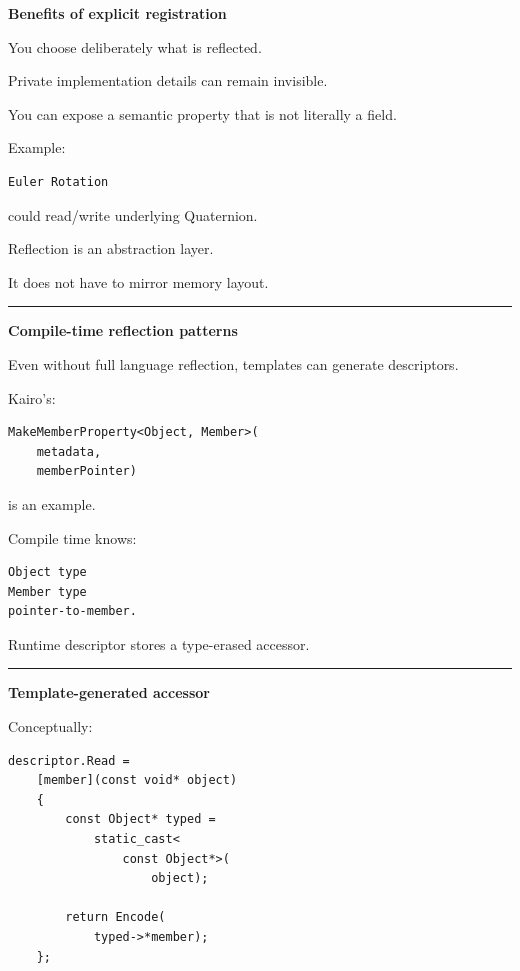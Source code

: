 \textbf{Benefits of explicit registration}

You choose deliberately what is reflected.

Private implementation details can remain invisible.

You can expose a semantic property that is not literally a field.

Example:

\begin{verbatim}
Euler Rotation
\end{verbatim}

could read/write underlying Quaternion.

Reflection is an abstraction layer.

It does not have to mirror memory layout.

\begin{center}\rule{0.5\linewidth}{0.5pt}\end{center}

\textbf{Compile-time reflection patterns}

Even without full language reflection, templates can generate descriptors.

Kairo's:

\begin{verbatim}
MakeMemberProperty<Object, Member>(
    metadata,
    memberPointer)
\end{verbatim}

is an example.

Compile time knows:

\begin{verbatim}
Object type
Member type
pointer-to-member.
\end{verbatim}

Runtime descriptor stores a type-erased accessor.

\begin{center}\rule{0.5\linewidth}{0.5pt}\end{center}

\textbf{Template-generated accessor}

Conceptually:

\begin{verbatim}
descriptor.Read =
    [member](const void* object)
    {
        const Object* typed =
            static_cast<
                const Object*>(
                    object);

        return Encode(
            typed->*member);
    };
\end{verbatim}

